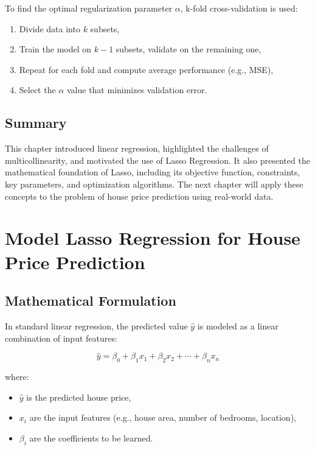\documentclass[12pt, a4paper]{report}
\begin{document}
To find the optimal regularization parameter \( \alpha \), k-fold cross-validation is used:

\begin{enumerate}
    \item Divide data into \( k \) subsets,
    \item Train the model on \( k-1 \) subsets, validate on the remaining one,
    \item Repeat for each fold and compute average performance (e.g., MSE),
    \item Select the \( \alpha \) value that minimizes validation error.
\end{enumerate}

\section{ Summary}

This chapter introduced linear regression, highlighted the challenges of multicollinearity, and motivated the use of Lasso Regression. It also presented the mathematical foundation of Lasso, including its objective function, constraints, key parameters, and optimization algorithms. The next chapter will apply these concepts to the problem of house price prediction using real-world data.


\chapter{ Model Lasso Regression for House Price Prediction}
\section{Mathematical Formulation}

In standard linear regression, the predicted value \( \hat{y} \) is modeled as a linear combination of input features:

\[
\hat{y} = \beta_0 + \beta_1 x_1 + \beta_2 x_2 + \cdots + \beta_n x_n
\]

where:
\begin{itemize}
    \item \( \hat{y} \) is the predicted house price,
    \item \( x_i \) are the input features (e.g., house area, number of bedrooms, location),
    \item \( \beta_i \) are the coefficients to be learned.
\end{itemize}
\end{document}
